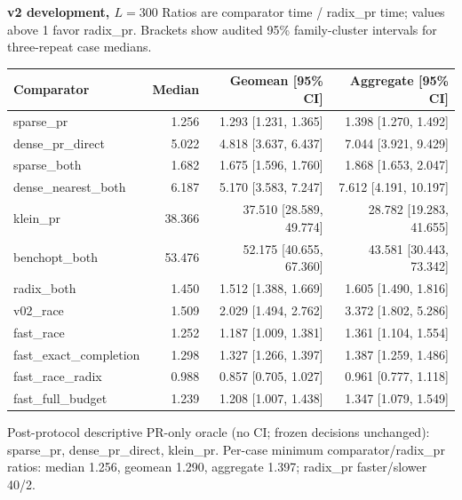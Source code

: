 \par\noindent\textbf{v2 development, $L=300$}
Ratios are comparator time / radix\_pr time; values above 1 favor radix\_pr.
Brackets show audited 95\% family-cluster intervals for three-repeat case medians.
\par\smallskip
\begin{tabular}{lrrr}
Comparator & Median & Geomean [95\% CI] & Aggregate [95\% CI] \\
\hline
sparse\_pr & 1.256 & 1.293 [1.231, 1.365] & 1.398 [1.270, 1.492] \\
dense\_pr\_direct & 5.022 & 4.818 [3.637, 6.437] & 7.044 [3.921, 9.429] \\
sparse\_both & 1.682 & 1.675 [1.596, 1.760] & 1.868 [1.653, 2.047] \\
dense\_nearest\_both & 6.187 & 5.170 [3.583, 7.247] & 7.612 [4.191, 10.197] \\
klein\_pr & 38.366 & 37.510 [28.589, 49.774] & 28.782 [19.283, 41.655] \\
benchopt\_both & 53.476 & 52.175 [40.655, 67.360] & 43.581 [30.443, 73.342] \\
radix\_both & 1.450 & 1.512 [1.388, 1.669] & 1.605 [1.490, 1.816] \\
v02\_race & 1.509 & 2.029 [1.494, 2.762] & 3.372 [1.802, 5.286] \\
fast\_race & 1.252 & 1.187 [1.009, 1.381] & 1.361 [1.104, 1.554] \\
fast\_exact\_completion & 1.298 & 1.327 [1.266, 1.397] & 1.387 [1.259, 1.486] \\
fast\_race\_radix & 0.988 & 0.857 [0.705, 1.027] & 0.961 [0.777, 1.118] \\
fast\_full\_budget & 1.239 & 1.208 [1.007, 1.438] & 1.347 [1.079, 1.549] \\
\end{tabular}
\par\smallskip
Post-protocol descriptive PR-only oracle (no CI; frozen decisions unchanged): sparse\_pr, dense\_pr\_direct, klein\_pr.
Per-case minimum comparator/radix\_pr ratios: median 1.256, geomean 1.290, aggregate 1.397; radix\_pr faster/slower 40/2.
